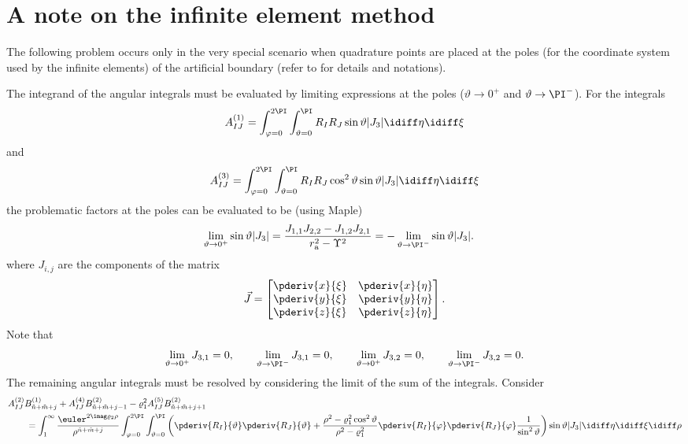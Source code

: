 \section{A note on the infinite element method}
\label{Sec:evaluationOfIEintegrals}
The following problem occurs only in the very special scenario when quadrature points are placed at the poles (for the coordinate system used by the infinite elements) of the artificial boundary (refer to \cite{Venas2018iao} for details and notations).

The integrand of the angular integrals \cite[Eq. (A.18)]{Venas2018iao} must be evaluated by limiting expressions at the poles ($\vartheta\to 0^+$ and $\vartheta\to \PI^-$). For the integrals
\begin{equation*}
	A_{IJ}^{(1)} = \int_{\varphi=0}^{2\PI}\int_{\vartheta=0}^\PI R_IR_J\sin\vartheta|J_3|\idiff\eta\idiff\xi
\end{equation*}
and
\begin{equation*}
	A_{IJ}^{(3)} = \int_{\varphi=0}^{2\PI}\int_{\vartheta=0}^\PI R_IR_J\cos^2\vartheta\sin\vartheta|J_3|\idiff\eta\idiff\xi
\end{equation*}
the problematic factors at the poles can be evaluated to be (using Maple)
\begin{align*}
	\lim_{\vartheta\to 0^+}\sin\vartheta|J_3| &= \frac{J_{1,1}J_{2,2}-J_{1,2}J_{2,1}}{r_{\mathrm{a}}^2-\Upsilon^2}= -\lim_{\vartheta\to \PI^-}\sin\vartheta|J_3|.
\end{align*}
where $J_{i,j}$ are the components of the matrix
\begin{equation*}
	\vec{J} = \begin{bmatrix}
		\pderiv{x}{\xi} & \pderiv{x}{\eta}\\
		\pderiv{y}{\xi} & \pderiv{y}{\eta}\\
		\pderiv{z}{\xi} & \pderiv{z}{\eta}
	\end{bmatrix}.
\end{equation*}
Note that
\begin{equation*}
	\lim_{\vartheta\to 0^+}J_{3,1} = 0,\qquad\lim_{\vartheta\to \PI^-}J_{3,1} = 0,\qquad\lim_{\vartheta\to 0^+}J_{3,2} = 0,\qquad\lim_{\vartheta\to \PI^-}J_{3,2} = 0.
\end{equation*}
The remaining angular integrals must be resolved by considering the limit of the sum of the integrals. Consider
\begin{align*}
	&A_{IJ}^{(2)}B_{\tilde{n}+\tilde{m}+j}^{(1)}+A_{IJ}^{(4)}B_{\tilde{n}+\tilde{m}+j-1}^{(2)}-\varrho_1^2 A_{IJ}^{(5)}B_{\tilde{n}+\tilde{m}+j+1}^{(2)}\\
	&\qquad = \int_1^\infty \frac{\euler^{2\imag \varrho_2\rho}}{\rho^{\tilde{n}+\tilde{m}+j}}\int_{\varphi=0}^{2\PI}\int_{\vartheta=0}^\PI \left(\pderiv{R_I}{\vartheta} \pderiv{R_J}{\vartheta}+ \frac{\rho^2-\varrho_1^2\cos^2\vartheta}{\rho^2-\varrho_1^2}\pderiv{R_I}{\varphi} \pderiv{R_J}{\varphi}\frac{1}{\sin^2\vartheta}\right)\sin\vartheta|J_3|\idiff\eta\idiff\xi\idiff\rho
\end{align*}
